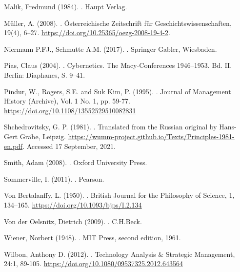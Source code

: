 \documentclass[a4paper,12pt]{scrartcl}
\begin{document}
\begin{thebibliography}{xxx}
  Malik, Fredmund (1984).
.
\newblock Haupt Verlag.

  Müller, A. (2008).
.
\newblock Österreichische Zeitschrift für Geschichtswissenschaften, 19(4), 6–27.
\newblock \url{https://doi.org/10.25365/oezg-2008-19-4-2}.

  Niermann P.FJ., Schmutte A.M. (2017).
.
\newblock Springer Gabler, Wiesbaden.

  Pias, Claus (2004).
.
\newblock Cybernetics. The Macy-Conferences 1946–1953. Bd. II. Berlin: Diaphanes, S. 9–41.

  Pindur, W., Rogers, S.E. and Suk Kim, P. (1995).
.
\newblock Journal of Management History (Archive), Vol. 1 No. 1, pp. 59-77.
\newblock \url{https://doi.org/10.1108/13552529510082831}

  Shchedrovitsky, G. P. (1981).
.
\newblock Translated from the Russian original by Hans-Gert Gräbe, Leipzig.
\newblock \url{https://wumm-project.github.io/Texts/Principles-1981-en.pdf}.
\newblock Accessed 17 September, 2021.

 Smith, Adam (2008).
.
\newblock Oxford University Press.

 Sommerville, I. (2011).
.
\newblock Pearson.

  Von Bertalanffy, L. (1950).
.
\newblock British Journal for the Philosophy of Science, 1, 134–165.
\newblock \url{https://doi.org/10.1093/bjps/I.2.134}

  Von der Oelsnitz, Dietrich (2009).
.
\newblock C.H.Beck.

  Wiener, Norbert (1948).
.
\newblock MIT Press, second edition, 1961.

 Wilbon, Anthony D. (2012).
.
\newblock Technology Analysis \& Strategic Management, 24:1, 89-105.
\newblock \url{https://doi.org/10.1080/09537325.2012.643564}


\end{thebibliography}
\end{document}
